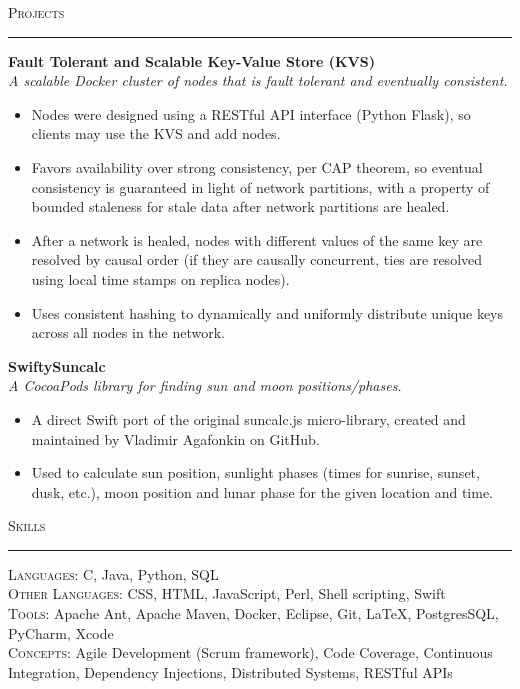 \documentclass{res}
\begin{document}
\begin{resume}
\textsc{{\Large Projects}}
\vspace{0.5mm}
\hrule width18.5cm
\textbf{Fault Tolerant and Scalable Key-Value Store (KVS)}\\
\textit{A scalable Docker cluster of nodes that is fault tolerant and eventually consistent.}
	\vspace{2mm}
	\begin{itemize}
		\item Nodes were designed using a RESTful API interface (Python Flask), so clients may use the KVS and add nodes.
		\item Favors availability over strong consistency, per CAP theorem, so eventual consistency is guaranteed in light of network partitions, with a property of bounded staleness for stale data after network partitions are healed.
		\item After a network is healed, nodes with different values of the same key are resolved by causal order (if they are causally concurrent, ties are resolved using local time stamps on replica nodes).
		\item Uses consistent hashing to dynamically and uniformly distribute unique keys across all nodes in the network.
	\end{itemize}
\textbf{SwiftySuncalc}\\
\textit{A CocoaPods library for finding sun and moon positions/phases.}
	\vspace{2mm}
	\begin{itemize}
		\item A direct Swift port of the original suncalc.js micro-library, created and maintained by Vladimir Agafonkin on GitHub.
		\item Used to calculate sun position, sunlight phases (times for sunrise, sunset, dusk, etc.), moon position and lunar phase for the given location and time.
  \end{itemize}

\textsc{{\Large Skills}}
\vspace{0.5mm}
\hrule width18.5cm
	\textsc{Languages:} C, Java, Python, SQL\\[2mm]
  \textsc{Other Languages:} CSS, HTML, JavaScript, Perl, Shell scripting, Swift\\[2mm]
  \textsc{Tools:} Apache Ant, Apache Maven, Docker, Eclipse, Git, \LaTeX, PostgresSQL, PyCharm, Xcode\\[2mm]
	\textsc{Concepts:} Agile Development (Scrum framework), Code Coverage, Continuous Integration, Dependency Injections, Distributed Systems, RESTful APIs\\[0.5mm]
\vspace{-2mm}
\end{resume}
\end{document}
